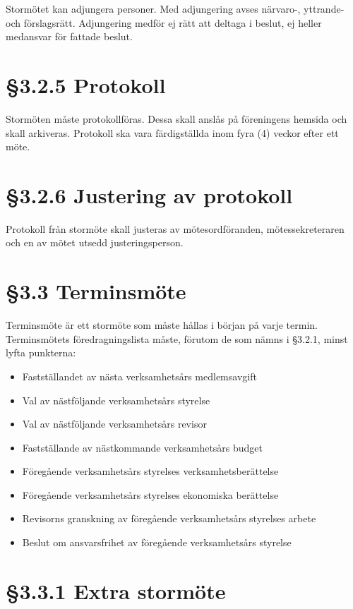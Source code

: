 \documentclass[]{article}
\providecommand{\tightlist}{%
  \setlength{\itemsep}{0pt}\setlength{\parskip}{0pt}}
\begin{document}
Stormötet kan adjungera personer. Med adjungering avses närvaro-,
yttrande- och förslagsrätt. Adjungering medför ej rätt att deltaga i
beslut, ej heller medansvar för fattade beslut.

\section{§3.2.5 Protokoll}\label{protokoll}

Stormöten måste protokollföras. Dessa skall anslås på föreningens
hemsida och skall arkiveras. Protokoll ska vara färdigställda inom fyra
(4) veckor efter ett möte.

\section{§3.2.6 Justering av protokoll}\label{justering-av-protokoll}

Protokoll från stormöte skall justeras av mötesordföranden,
mötessekreteraren och en av mötet utsedd justeringsperson.

\section{§3.3 Terminsmöte}\label{terminsmuxf6te}

Terminsmöte är ett stormöte som måste hållas i början på varje termin. Terminsmötets föredragningslista måste, förutom de som nämns i §3.2.1, minst lyfta punkterna:

\begin{itemize}
\tightlist
\item
  Fastställandet av nästa verksamhetsårs medlemsavgift
\item
  Val av nästföljande verksamhetsårs styrelse
\item
  Val av nästföljande verksamhetsårs revisor
\item
  Fastställande av nästkommande verksamhetsårs budget
\item
  Föregående verksamhetsårs styrelses verksamhetsberättelse
\item
  Föregående verksamhetsårs styrelses ekonomiska berättelse
\item
  Revisorns granskning av föregående verksamhetsårs styrelses arbete
\item
  Beslut om ansvarsfrihet av föregående verksamhetsårs styrelse
\end{itemize}

\section{§3.3.1 Extra stormöte}\label{extra-stormuxf6te}
\end{document}
